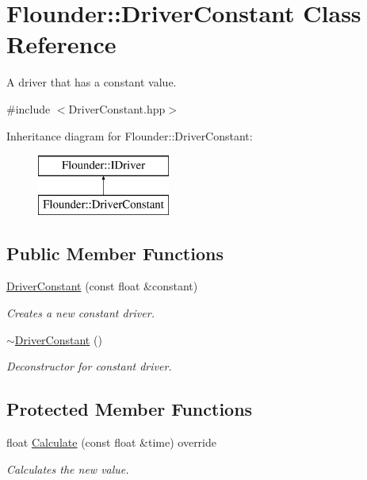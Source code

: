 \hypertarget{class_flounder_1_1_driver_constant}{}\section{Flounder\+:\+:Driver\+Constant Class Reference}
\label{class_flounder_1_1_driver_constant}


A driver that has a constant value.  




{\ttfamily \#include $<$Driver\+Constant.\+hpp$>$}

Inheritance diagram for Flounder\+:\+:Driver\+Constant\+:\begin{figure}[H]
\begin{center}
\leavevmode
\includegraphics[height=2.000000cm]{class_flounder_1_1_driver_constant}
\end{center}
\end{figure}
\subsection*{Public Member Functions}
\begin{DoxyCompactItemize}
\item 
\hyperlink{class_flounder_1_1_driver_constant_a591cd1e7c9ec47a37b7007aff42d6ff7}{Driver\+Constant} (const float \&constant)
\begin{DoxyCompactList}\small\item\em Creates a new constant driver. \end{DoxyCompactList}\item 
\hyperlink{class_flounder_1_1_driver_constant_a7e4f905297655e36b7d7d6ba946f3fad}{$\sim$\+Driver\+Constant} ()
\begin{DoxyCompactList}\small\item\em Deconstructor for constant driver. \end{DoxyCompactList}\end{DoxyCompactItemize}
\subsection*{Protected Member Functions}
\begin{DoxyCompactItemize}
\item 
float \hyperlink{class_flounder_1_1_driver_constant_acdad6e0184d414f0e3d60f645c2d472d}{Calculate} (const float \&time) override
\begin{DoxyCompactList}\small\item\em Calculates the new value. \end{DoxyCompactList}\end{DoxyCompactItemize}

